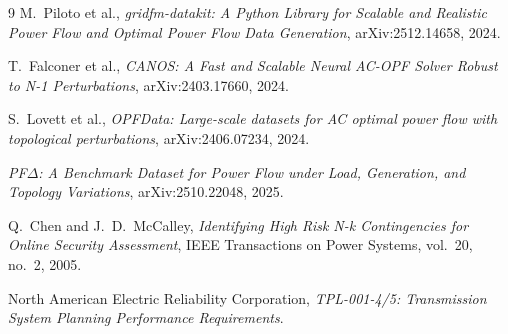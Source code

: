 \documentclass{article}
\begin{document}
\vspace{1em}
\begin{thebibliography}{9}
M.~Piloto et al.,
\emph{gridfm-datakit: A Python Library for Scalable and Realistic Power Flow
and Optimal Power Flow Data Generation},
arXiv:2512.14658, 2024.

T.~Falconer et al.,
\emph{CANOS: A Fast and Scalable Neural AC-OPF Solver Robust to N-1
Perturbations}, arXiv:2403.17660, 2024.

S.~Lovett et al.,
\emph{OPFData: Large-scale datasets for AC optimal power flow with topological
perturbations}, arXiv:2406.07234, 2024.

\emph{PF$\Delta$: A Benchmark Dataset for Power Flow under Load, Generation, and
Topology Variations}, arXiv:2510.22048, 2025.

Q.~Chen and J.~D.~McCalley,
\emph{Identifying High Risk N-k Contingencies for Online Security Assessment},
IEEE Transactions on Power Systems, vol.~20, no.~2, 2005.

North American Electric Reliability Corporation,
\emph{TPL-001-4/5: Transmission System Planning Performance Requirements}.
\end{thebibliography}
\end{document}
